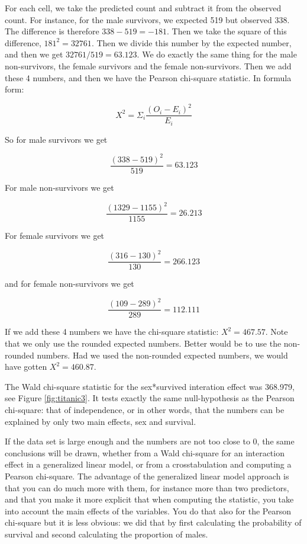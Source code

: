 \documentclass[]{book}\usepackage[]{graphicx}\usepackage[]{color}
\begin{document}
For each cell, we take the predicted count and subtract it from the observed count. For instance, for the male survivors, we expected 519 but observed 338. The difference is therefore $338-519= -181$. Then we take the square of this difference, $ 181^2=32761$. Then we divide this number by the expected number, and then we get $32761/519=63.123$. We do exactly the same thing for the male non-survivors, the female survivors and the female non-survivors. Then we add these 4 numbers, and then we have the Pearson chi-square statistic. In formula form:

\begin{equation}
X^2 = \Sigma_i    \frac{(O_i-E_i)^2}{E_i}
\end{equation}


So for male survivors we get


\begin{equation}
 \frac{(338-519)^2}{519} =63.123
\end{equation}




For male non-survivors we get


\begin{equation}
 \frac{(1329-1155)^2}{1155} =26.213
\end{equation}

For female survivors we get


\begin{equation}
 \frac{(316-130)^2}{130} =266.123
\end{equation}

and for female non-survivors we get

\begin{equation}
 \frac{(109-289)^2}{289} =112.111
\end{equation}




If we add these 4 numbers we have the chi-square statistic: $X^2= 467.57$. Note that we only use the rounded expected numbers. Better would be to use the non-rounded numbers. Had we used the non-rounded expected numbers, we would have gotten $X^2 = 460.87$.

The Wald chi-square statistic for the sex*survived interation effect was 368.979, see Figure \ref{fig:titanic3}. It tests exactly the same null-hypothesis as the Pearson chi-square: that of independence, or in other words, that the numbers can be explained by only two main effects, sex and survival.

If the data set is large enough and the numbers are not too close to 0, the same conclusions will be drawn, whether from a Wald chi-square for an interaction effect in a generalized linear model, or from a crosstabulation and computing a Pearson chi-square. The advantage of the generalized linear model approach is that you can do much more with them, for instance more than two predictors, and that you make it more explicit that when computing the statistic, you take into account the main effects of the variables. You do that also for the Pearson chi-square but it is less obvious: we did that by first calculating the probability of survival and second calculating the proportion of males.
\end{document}
